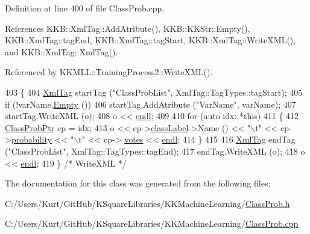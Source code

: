 Definition at line 400 of file Class\+Prob.\+cpp.



References K\+K\+B\+::\+Xml\+Tag\+::\+Add\+Atribute(), K\+K\+B\+::\+K\+K\+Str\+::\+Empty(), K\+K\+B\+::\+Xml\+Tag\+::tag\+End, K\+K\+B\+::\+Xml\+Tag\+::tag\+Start, K\+K\+B\+::\+Xml\+Tag\+::\+Write\+X\+M\+L(), and K\+K\+B\+::\+Xml\+Tag\+::\+Xml\+Tag().



Referenced by K\+K\+M\+L\+L\+::\+Training\+Process2\+::\+Write\+X\+M\+L().


\begin{DoxyCode}
403 \{
404   \hyperlink{class_k_k_b_1_1_xml_tag}{XmlTag}  startTag (\textcolor{stringliteral}{"ClassProbList"},  XmlTag::TagTypes::tagStart);
405   \textcolor{keywordflow}{if}  (!varName.\hyperlink{class_k_k_b_1_1_k_k_str_ac69942f73fffd672ec2a6e1c410afdb6}{Empty} ())
406     startTag.AddAtribute (\textcolor{stringliteral}{"VarName"}, varName);
407   startTag.WriteXML (o);
408   o << \hyperlink{namespace_k_k_b_ad1f50f65af6adc8fa9e6f62d007818a8}{endl};
409 
410   \textcolor{keywordflow}{for}  (\textcolor{keyword}{auto} idx:  *\textcolor{keyword}{this})
411   \{
412     \hyperlink{class_k_k_m_l_l_1_1_class_prob}{ClassProbPtr}  cp = idx;
413     o << cp->\hyperlink{class_k_k_m_l_l_1_1_class_prob_ac9d2a9c81bb36e0adc444b4409f9410d}{classLabel}->Name () << \textcolor{stringliteral}{"\(\backslash\)t"} << cp->\hyperlink{class_k_k_m_l_l_1_1_class_prob_acea1b6e0e6011c4d7d1008a73c6bbc37}{probability} << \textcolor{stringliteral}{"\(\backslash\)t"} << cp->
      \hyperlink{class_k_k_m_l_l_1_1_class_prob_a0e0ab2ae02ec4390c60f87c1ab450da8}{votes} << \hyperlink{namespace_k_k_b_ad1f50f65af6adc8fa9e6f62d007818a8}{endl};
414   \}
415   
416   \hyperlink{class_k_k_b_1_1_xml_tag}{XmlTag}  endTag (\textcolor{stringliteral}{"ClassProbList"}, XmlTag::TagTypes::tagEnd);
417   endTag.WriteXML (o);
418   o << \hyperlink{namespace_k_k_b_ad1f50f65af6adc8fa9e6f62d007818a8}{endl};
419 \}  \textcolor{comment}{/* WriteXML */}
\end{DoxyCode}


The documentation for this class was generated from the following files\+:\begin{DoxyCompactItemize}
\item 
C\+:/\+Users/\+Kurt/\+Git\+Hub/\+K\+Square\+Libraries/\+K\+K\+Machine\+Learning/\hyperlink{_class_prob_8h}{Class\+Prob.\+h}\item 
C\+:/\+Users/\+Kurt/\+Git\+Hub/\+K\+Square\+Libraries/\+K\+K\+Machine\+Learning/\hyperlink{_class_prob_8cpp}{Class\+Prob.\+cpp}\end{DoxyCompactItemize}
